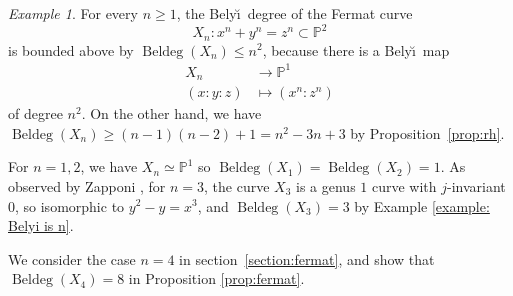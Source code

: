 \documentclass{amsproc}
\numberwithin{equation}{section}
\numberwithin{figure}{section}
\theoremstyle{definition}
\theoremstyle{remark}
\newtheorem{example}[equation]{Example}
\DeclareMathOperator{\Beldeg}{Beldeg}
\newcommand{\Bdeg}{\Beldeg}
\newcommand{\Qbar}{\overline{\mathbb{Q}}}
\newcommand\PP{\mathbb{P}}
\newcommand\ZZ{\mathbb{Z}}
\newcommand{\p}{\mathbb{P}}
\renewcommand{\leq}{\leqslant}
\renewcommand{\geq}{\geqslant}
\newcommand{\Belyi}{Bely\u{\i}}
\begin{document}
\begin{example} \label{exm:Fermatz}
 For every $n\geq 1$, the \Belyi\ degree of the Fermat curve 
 \[ X_n\colon x^n+y^n=z^n \subset \PP^2 \] 
 is bounded above by $\Bdeg(X_n) \leq n^2$, because there is a \Belyi\ map 
 \begin{align*}
 X_n &\to \PP^1 \\
 (x:y:z) &\mapsto (x^n:z^n)
 \end{align*} 
 of degree $n^2$.  On the other hand, we have $\Bdeg(X_n) \geq (n-1)(n-2)+1 = n^2 - 3n +3$ by  Proposition~\ref{prop:rh}.
 
For $n=1,2$, we have $X_n \simeq \PP^1$ so $\Bdeg(X_1)=\Bdeg(X_2)=1$.  As observed by Zapponi \cite[Example~1.2]{Zapponi}, for $n=3$, the curve $X_3$ is a genus $1$ curve with $j$-invariant $0$, so isomorphic to $y^2-y=x^3$, and $\Beldeg(X_3)=3$ by Example \ref{example: Belyi is n}.

We consider the case $n=4$ in section~\ref{section:fermat}, and show that $\Bdeg(X_4)=8$ in Proposition \ref{prop:fermat}.
\end{example}



\end{document}

